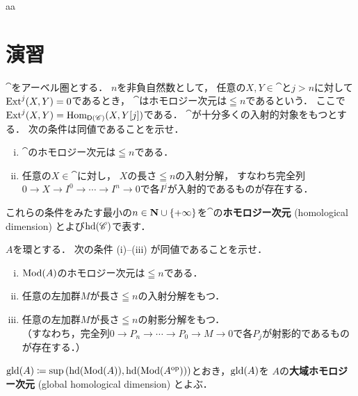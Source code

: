 \begin{CRL}\label{CRL178}
    aa
\end{CRL}


\section*{演習}


\setcounter{EXC}{16}
\begin{leftbar}
\begin{EXC}[ホモロジー次元]\label{EXC116}
    \(\cat\)をアーベル圏とする．
    \(n\)を非負自然数として，
    任意の\(X,Y\in\cat\)と\(j>n\)に対して\(\mathop{\mathrm{Ext}}\nolimits^{j}(X,Y)=0\)であるとき，
    \(\cat\)はホモロジー次元は\(\leqq n\)であるという．
    ここで\(\mathop{\mathrm{Ext}}\nolimits^{j}(X,Y)=\mathop{\mathrm{Hom}}\nolimits_{\mathsf{D}(\mathscr{C})}(X,Y[j])\)である．
    \(\cat\)が十分多くの入射的対象をもつとする．
    次の条件は同値であることを示せ．    
    \begin{enumerate}[(i)]
        \item \(\cat\)のホモロジー次元は\(\leqq n\)である．
        \item 任意の\(X\in\cat\)に対し，
        \(X\)の長さ\(\leqq n\)の入射分解，
        すなわち完全列\(
            0\to X\to I^{0}\to \cdots\to I^{n}\to 0
        \)で各\(I^{j}\)が入射的であるものが存在する．
    \end{enumerate}
    
    これらの条件をみたす最小の\(
        n\in\mathbf{N}\cup\{+\infty\}
    \)を\(\cat\)の\textbf{ホモロジー次元} (homological 
    dimension) とよび\(\mathop{\mathrm{hd}}\nolimits(\mathscr{C})\)で表す．
\end{EXC}
\end{leftbar}


\setcounter{EXC}{27}

\begin{leftbar}
\begin{EXC}[大域ホモロジー次元]\label{EXC128}
    \(A\)を環とする．
    次の条件 (i)--(iii) が同値であることを示せ．    
    \begin{enumerate}[(i)]
        \item \(\mathop{\mathrm{Mod}}\nolimits(A)\)のホモロジー次元は\(\leqq n\)である．
        \item 任意の左加群\(M\)が長さ\(\leqq n\)の入射分解をもつ．
        \item 任意の左加群\(M\)が長さ\(\leqq n\)の射影分解をもつ．\\（すなわち，完全列\(0\to P_{n}\to \cdots\to P_{0}\to M\to 0\)で各\(P_j\)が射影的であるものが存在する．）
    \end{enumerate}
    
    \(
        \mathop{\mathrm{gld}}\nolimits(A)\coloneqq
        \sup\left(\mathop{\mathrm{hd}}\nolimits(\mathop{\mathrm{Mod}}\nolimits(A)),\mathop{\mathrm{hd}}\nolimits(\mathop{\mathrm{Mod}}\nolimits(A^{{\rm op}}))\right)
    \)とおき，\(\mathop{\mathrm{gld}}\nolimits(A)\)を
    \(A\)の\textbf{大域ホモロジー次元} (global 
    homological dimension) とよぶ．
\end{EXC}
\end{leftbar}


